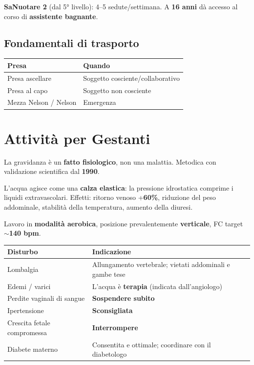 \documentclass[12pt, a4paper]{article}
\begin{document}
\textbf{SaNuotare 2} (dal 5° livello): 4--5 sedute/settimana. A \textbf{16 anni} dà accesso al corso di \textbf{assistente bagnante}.

\subsection{Fondamentali di trasporto}

\begin{tabularx}{\textwidth}{lX}
\toprule
\rowcolor{light} \textbf{Presa} & \textbf{Quando} \\
\midrule
Presa ascellare & Soggetto cosciente/collaborativo \\
Presa al capo & Soggetto non cosciente \\
Mezza Nelson / Nelson & Emergenza \\
\bottomrule
\end{tabularx}

\section{Attività per Gestanti}

La gravidanza è un \textbf{fatto fisiologico}, non una malattia. Metodica con validazione scientifica dal \textbf{1990}.

L'acqua agisce come una \textbf{calza elastica}: la pressione idrostatica comprime i liquidi extravascolari. Effetti: ritorno venoso +\textbf{60\%}, riduzione del peso addominale, stabilità della temperatura, aumento della diuresi.

Lavoro in \textbf{modalità aerobica}, posizione prevalentemente \textbf{verticale}, FC target $\sim$\textbf{140 bpm}.

\begin{tabularx}{\textwidth}{lX}
\toprule
\rowcolor{light} \textbf{Disturbo} & \textbf{Indicazione} \\
\midrule
Lombalgia & Allungamento vertebrale; vietati addominali e gambe tese \\
Edemi / varici & L'acqua è \textbf{terapia} (indicata dall'angiologo) \\
Perdite vaginali di sangue & \textbf{Sospendere subito} \\
Ipertensione & \textbf{Sconsigliata} \\
Crescita fetale compromessa & \textbf{Interrompere} \\
Diabete materno & Consentita e ottimale; coordinare con il diabetologo \\
\bottomrule
\end{tabularx}
\end{document}
